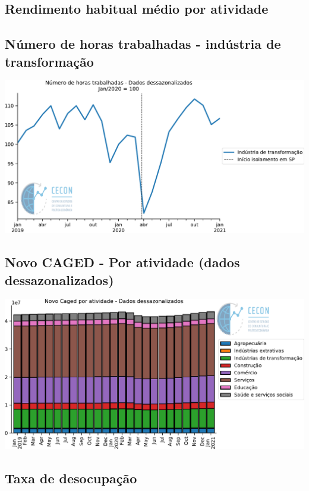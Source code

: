 \documentclass{SelfArx}
\begin{document}
\subsection*{Rendimento habitual médio por atividade}
\label{sec:org594bbe6}

\subsection*{Número de horas trabalhadas - indústria de transformação}
\label{sec:org257865c}

\begin{center}
\includegraphics[width=.9\linewidth]{./figs/Emprego/Horas_Transformacao.pdf}
\end{center}

\subsection*{Novo CAGED  - Por atividade (dados dessazonalizados)}
\label{sec:orgf6349a2}

\begin{center}
\includegraphics[width=.9\linewidth]{./figs/Emprego/NovoCaged_Atividade.pdf}
\end{center}



\subsection*{Taxa de desocupação}
\label{sec:orgf11783f}
\end{document}
